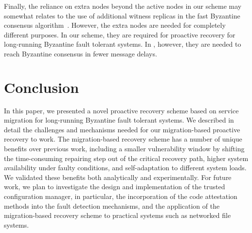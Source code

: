 \documentclass[times, 10pt, twocolumn]{article}
\begin{document}
Finally, the reliance on extra nodes beyond the  active nodes in our
scheme may somewhat relates to the use of  
additional witness replicas in the fast Byzantine consensus 
algorithm~\cite{fbc}. However, the extra nodes are needed for completely
different purposes. In our scheme, they are required for proactive recovery
for long-running Byzantine fault tolerant systems. In \cite{fbc}, however,
they are needed to reach Byzantine consensus in fewer message delays.


\section{Conclusion}
In this paper, we presented a novel proactive recovery scheme based
on service migration for long-running Byzantine fault tolerant
systems. We described in detail the challenges and mechanisms needed
for our migration-based proactive recovery to work. The migration-based 
recovery scheme has a number of unique benefits over previous work,
including a smaller vulnerability window by shifting the time-consuming 
repairing step out of the critical recovery path, higher system availability 
under faulty conditions, and self-adaptation to different system loads.
We validated these benefits both analytically and experimentally. For
future work, we plan to investigate the design and implementation of the 
trusted configuration manager, in particular, the incorporation of the 
code attestation methods \cite{code1,code2} into the fault detection 
mechanisms, and the application of the migration-based
recovery scheme to practical systems such as networked file systems.
\end{document}
